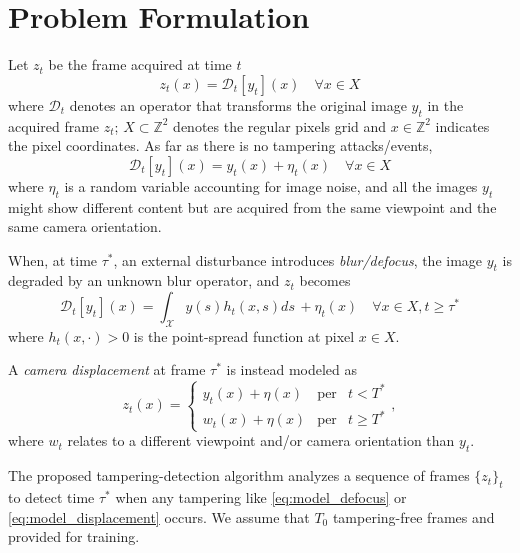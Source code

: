 \documentclass{llncs}
\begin{document}
\section{Problem Formulation}\label{sec:probForm}
%
Let $z_t$ be the frame acquired at time $t$
\begin{equation}
\label{eq:observationModel}
z_t(x)=\mathcal{D}_t[y_t](x) \quad \forall x \in X
\end{equation}
where $\mathcal{D}_t$ denotes an operator that transforms the original image $y_t$ in the acquired frame $z_t$; $X \subset \mathbb{Z}^2$ denotes the regular pixels grid and $x\in \mathbb{Z}^2$ indicates the pixel coordinates. As far as there is no tampering attacks/events,
\begin{equation}
\label{eq:no_tampering}
\mathcal{D}_t[y_t](x) = y_t(x) + \eta_t(x) \quad \forall x \in X
\end{equation}
where $\eta_t$ is a random variable accounting for image noise, %
and all the images $y_t$ might show different content but are acquired from the same viewpoint and the same camera orientation.

When, at time $\tau^*$, an external disturbance introduces \emph{blur/defocus}, the image $y_t$ is degraded by an unknown blur operator, and $z_t$ becomes
\begin{equation}
\label{eq:model_defocus}
\mathcal{D}_t[y_t](x) = \int_{\mathcal{X}}y(s)h_t(x,s)ds\, + \eta_t(x) \quad \forall x \in X, t \geq \tau^*
\end{equation}
where $h_t(x,\cdot) > 0$ is the point-spread function at pixel $x \in X$.

A \emph{camera displacement} at frame $\tau^*$ is instead modeled as 
\begin{equation}
\label{eq:model_displacement}
z_t(x)  = \left\{ \begin{array}{rcl}
y_t(x) + \eta(x) & \mbox{per} & t < T^* \\
w_t(x) + \eta(x) & \mbox{per} & t \geqslant T^*
\end{array}\right. ,
\end{equation}
where $w_t$ relates to a different viewpoint and/or camera orientation than $y_t$. 

The proposed tampering-detection algorithm analyzes a sequence of frames $\{z_t\}_t$ to detect time $\tau^*$ when any tampering like \eqref{eq:model_defocus} or \eqref{eq:model_displacement} occurs. We assume that $T_0$ tampering-free frames and provided for training.
\end{document}

